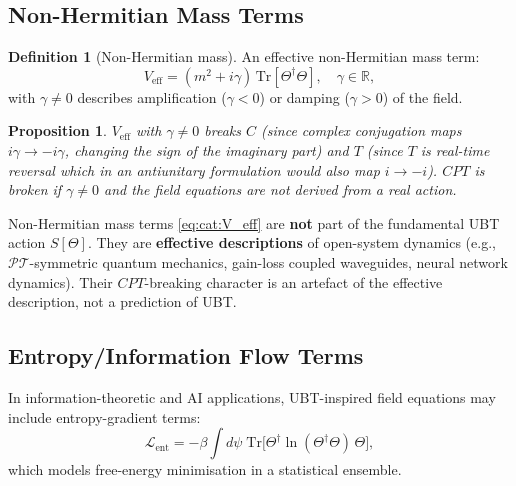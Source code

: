 \documentclass[12pt,a4paper]{article}
\newtheorem{proposition}[theorem]{Proposition}
\theoremstyle{definition}
\newtheorem{definition}[theorem]{Definition}
\theoremstyle{remark}
\begin{document}
\subsection{Non-Hermitian Mass Terms}
\label{subsec:cat:non_herm}

\begin{definition}[Non-Hermitian mass]
\label{def:cat:non_hermitian}
An effective non-Hermitian mass term:
\begin{equation}
  V_{\mathrm{eff}} = (m^2 + i\gamma)\,\mathrm{Tr}[\Theta^\dagger\Theta],
  \quad \gamma \in \mathbb{R},
  \label{eq:cat:V_eff}
\end{equation}
with $\gamma \neq 0$ describes amplification ($\gamma < 0$) or damping
($\gamma > 0$) of the field.
\end{definition}

\begin{proposition}
$V_{\mathrm{eff}}$ with $\gamma \neq 0$ breaks $C$ (since complex conjugation
maps $i\gamma \to -i\gamma$, changing the sign of the imaginary part) and $T$
(since $T$ is real-time reversal which in an antiunitary formulation would
also map $i \to -i$).
$CPT$ is broken if $\gamma \neq 0$ and the field equations are not derived
from a real action.
\end{proposition}

\begin{warnbox}
Non-Hermitian mass terms \eqref{eq:cat:V_eff} are \textbf{not} part of the
fundamental UBT action $S[\Theta]$.  They are \textbf{effective descriptions}
of open-system dynamics (e.g., $\mathcal{PT}$-symmetric quantum mechanics,
gain-loss coupled waveguides, neural network dynamics).
Their $CPT$-breaking character is an artefact of the effective description,
not a prediction of UBT.
\end{warnbox}

\subsection{Entropy/Information Flow Terms}
\label{subsec:cat:entropy}

In information-theoretic and AI applications, UBT-inspired field equations
may include entropy-gradient terms:
\begin{equation}
  \mathcal{L}_{\mathrm{ent}}
  = -\beta \int d\psi\;
    \mathrm{Tr}\!\bigl[\Theta^\dagger \ln(\Theta^\dagger\Theta)\,\Theta\bigr],
  \label{eq:cat:L_ent}
\end{equation}
which models free-energy minimisation in a statistical ensemble.
\end{document}
